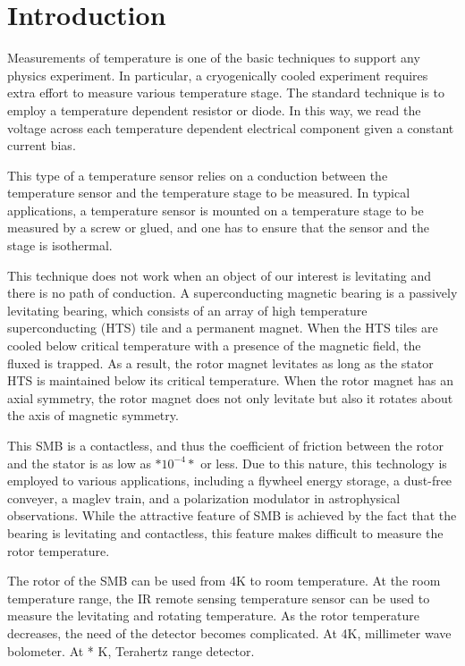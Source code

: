 \section{Introduction}

Measurements of temperature is one of the basic techniques to support any physics experiment.
In particular, a cryogenically cooled experiment requires extra effort to measure various temperature stage.
The standard technique is to employ a temperature dependent resistor or diode.
In this way, we read the voltage across each temperature dependent electrical component given a constant current bias.

This type of a temperature sensor relies on a conduction between the temperature sensor and the temperature stage to be measured.
In typical applications, a temperature sensor is mounted on a temperature stage to be measured by a screw or glued, and one has to ensure that the sensor and the stage is isothermal.

This technique does not work when an object of our interest is levitating and there is no path of conduction.
A superconducting magnetic bearing is a passively levitating bearing, which consists of an array of high temperature superconducting (HTS) tile and a permanent magnet.
When the HTS tiles are cooled below critical temperature with a presence of the magnetic field, the fluxed is trapped.
As a result, the rotor magnet levitates as long as the stator HTS is maintained below its critical temperature.
When the rotor magnet has an axial symmetry, the rotor magnet does not only levitate but also it rotates about the axis of magnetic symmetry.

This SMB is a contactless, and thus the coefficient of friction between the rotor and the stator is as low as $*10^{-4}*$ or less.
Due to this nature, this technology is employed to various applications, including a flywheel energy storage, a dust-free conveyer, a maglev train, and a polarization modulator in astrophysical observations.
While the attractive feature of SMB is achieved by the fact that the bearing is levitating and contactless, this feature makes difficult to measure the rotor temperature.

The rotor of the SMB can be used from 4K to room temperature.
At the room temperature range, the IR remote sensing temperature sensor can be used to measure the levitating and rotating temperature.
As the rotor temperature decreases, the need of the detector becomes complicated.
At 4K, millimeter wave bolometer.
At * K, Terahertz range detector.

